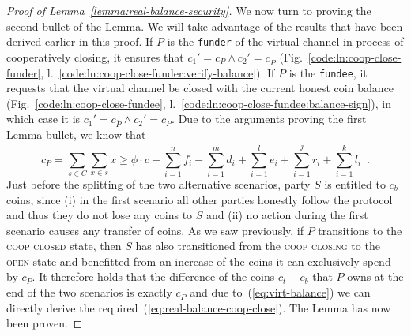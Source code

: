 \begin{proof}[Proof of Lemma~\ref{lemma:real-balance-security}]
  We now turn to proving the second bullet of the Lemma. We will take advantage
  of the results that have been derived earlier in this proof. If $P$ is
  the \texttt{funder} of the virtual channel in process
  of cooperatively closing, it ensures that $c_1' = c_P \wedge c_2' =
  c_{\bar{P}}$ (Fig.~\ref{code:ln:coop-close-funder},
  l.~\ref{code:ln:coop-close-funder:verify-balance}). If $P$ is the
  \texttt{fundee}, it requests that the virtual channel be closed with the
  current honest coin balance (Fig.~\ref{code:ln:coop-close-fundee},
  l.~\ref{code:ln:coop-close-fundee:balance-sign}), in which case it is $c_1' =
  c_{\bar{P}} \wedge c_2' = c_P$. Due to the arguments proving
  the first Lemma bullet, we know that
  \begin{equation}
    \label{eq:virt-balance}
    c_P = \sum\limits_{s \in C} \sum\limits_{x \in s} x \geq \phi \cdot c -
    \sum\limits_{i=1}^n f_i - \sum\limits_{i=1}^m d_i + \sum\limits_{i=1}^l e_i
    + \sum\limits_{i=1}^j r_i + \sum\limits_{i=1}^k l_i \enspace.
  \end{equation}
  Just before the splitting of the two alternative scenarios, party $S$ is
  entitled to $c_b$ coins, since (i) in the first scenario all other parties
  honestly follow the protocol and thus they do not lose any coins to $S$ and
  (ii) no action during the first scenario causes any transfer of coins. As we
  saw previously, if $P$ transitions to the \textsc{coop closed} state, then $S$
  has also transitioned from the \textsc{coop closing} to the \textsc{open}
  state and benefitted from an increase of the coins it can exclusively spend by
  $c_P$. It therefore holds that the difference of the coins $c_t - c_b$ that
  $P$ owns at the end of the two scenarios is exactly $c_P$ and due
  to~(\ref{eq:virt-balance}) we can directly derive the
  required~(\ref{eq:real-balance-coop-close}). The Lemma has now been proven.
\end{proof}
